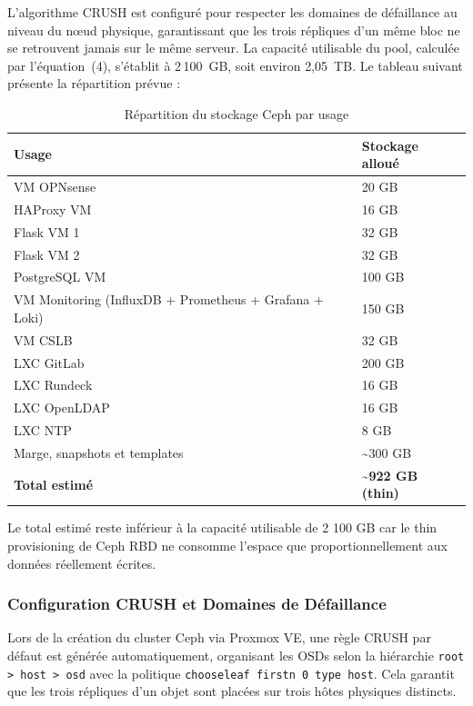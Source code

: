 \par L'algorithme CRUSH est configuré pour respecter les domaines de défaillance au niveau du nœud physique, garantissant que les trois répliques d'un même bloc ne se retrouvent jamais sur le même serveur. La capacité utilisable du pool, calculée par l'équation~(4), s'établit à 2\,100~GB, soit environ 2,05~TB. Le tableau suivant présente la répartition prévue :\\


\begin{table}[H]
\centering
\caption{Répartition du stockage Ceph par usage}
\label{tab:repartition-stockage}
\begin{tabular}{|p{7.5cm}|p{4cm}|}
\hline
\textbf{Usage} & \textbf{Stockage alloué} \\
\hline
VM OPNsense & 20 GB \\
\hline
HAProxy VM & 16 GB \\
\hline
Flask VM 1 & 32 GB \\
\hline
Flask VM 2 & 32 GB \\
\hline
PostgreSQL VM & 100 GB \\
\hline
VM Monitoring (InfluxDB + Prometheus + Grafana + Loki) & 150 GB \\
\hline
VM CSLB & 32 GB \\
\hline
LXC GitLab & 200 GB \\
\hline
LXC Rundeck & 16 GB \\
\hline
LXC OpenLDAP & 16 GB \\
\hline
LXC NTP & 8 GB \\
\hline
Marge, snapshots et templates & \textasciitilde{}300 GB \\
\hline
\textbf{Total estimé} & \textbf{\textasciitilde{}922 GB (thin)} \\
\hline
\end{tabular}
\end{table}

\par Le total estimé reste inférieur à la capacité utilisable de 2 100 GB car le thin provisioning de Ceph RBD ne consomme l'espace que proportionnellement aux données réellement écrites.\\

\subsubsection{Configuration CRUSH et Domaines de Défaillance}

\par Lors de la création du cluster Ceph via Proxmox VE, une règle CRUSH par défaut est générée automatiquement, organisant les OSDs selon la hiérarchie \texttt{root > host > osd} avec la politique \texttt{chooseleaf firstn 0 type host}. Cela garantit que les trois répliques d'un objet sont placées sur trois hôtes physiques distincts.\\

